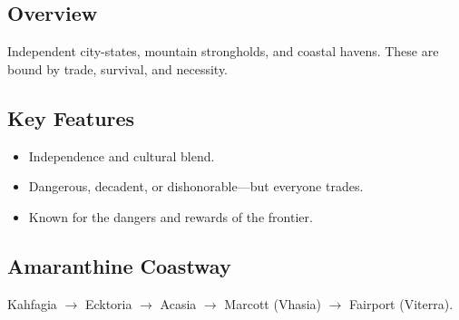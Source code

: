\subsection*{Overview}
Independent city-states, mountain strongholds, and coastal havens. These are bound by trade, survival, and necessity.

\subsection*{Key Features}
\begin{itemize}[leftmargin=*]
    \item Independence and cultural blend.
    \item Dangerous, decadent, or dishonorable—but everyone trades.
    \item Known for the dangers and rewards of the frontier.
\end{itemize}

\subsection*{Amaranthine Coastway}
Kahfagia $\rightarrow$ Ecktoria $\rightarrow$ Acasia $\rightarrow$ Marcott (Vhasia) $\rightarrow$ Fairport (Viterra).
